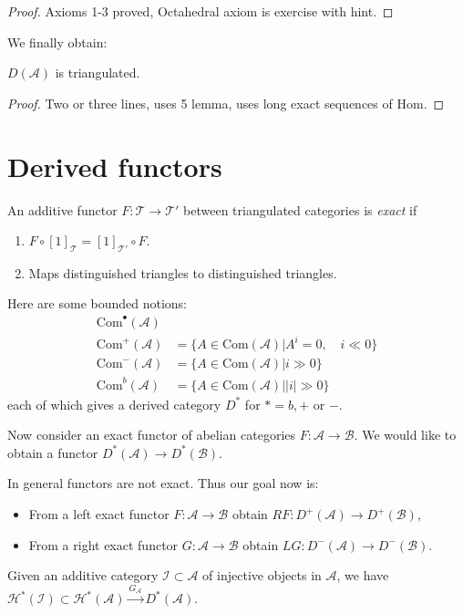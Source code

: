 \begin{proof}
Axioms 1-3 proved, Octahedral axiom is
exercise with hint.
\end{proof}

We finally obtain:

\begin{lemma}
\label{dcos-label-031}
$D(\mathcal{A})$ is triangulated.
\end{lemma}

\begin{proof}
Two or three lines, uses 5 lemma, uses long
exact sequences of $\text{Hom}$.
\end{proof}

\section{Derived functors}
\label{section-derived-functors}

\begin{definition}
\label{definition-additive-exact-functor}
An additive functor $F:\mathcal{T} \to
\mathcal{T}'$ between triangulated categories
is {\it exact} if
\begin{enumerate}
\item $F \circ
[1]_{\mathcal{T}}=[1]_{\mathcal{T}'}\circ F$.
\item Maps distinguished triangles to
distinguished triangles.
\end{enumerate}
\end{definition}

\medskip\noindent
Here are some bounded notions:
$$
\begin{aligned}
\text{Com}^\bullet(\mathcal{A})&\\
\text{Com}^+(\mathcal{A})&=\{A\in
\text{Com}(\mathcal{A})
|A^i=0,\quad i\ll 0\}\\
\text{Com}^-(\mathcal{A})&=\{A\in
\text{Com}(\mathcal{A})|i \gg 0\}\\
\text{Com}^b(\mathcal{A})&=\{A \in
\text{Com}(\mathcal{A})||i|\gg 0\}
\end{aligned}
$$
each of which gives a derived category $D^*$
for $*=b,+$ or $-$.

Now consider an exact functor of abelian
categories $F:\mathcal{A} \to
\mathcal{B}$. We would like to obtain a
functor
$D^*(\mathcal{A}) \to D^*(\mathcal{B})$.

In general functors are not exact. Thus our
goal now is:
\begin{itemize}
\item From a left exact functor
$F:\mathcal{A} \to \mathcal{B}$ obtain
$RF:D^+(\mathcal{A})\to D^+(\mathcal{B})$,
\item From a right exact functor
$G:\mathcal{A}\to \mathcal{B}$ obtain
$LG:D^-(\mathcal{A})\to D^-(\mathcal{B})$.
\end{itemize}
Given an additive category $\mathcal{I}
\subset \mathcal{A}$ of injective objects in
$\mathcal{A}$, we have  $\mathcal{H}^*
(\mathcal{I})\subset
\mathcal{H}^* (\mathcal{A})
\xrightarrow{G_{\mathcal{A}}}D^*(\mathcal{A})
$.


